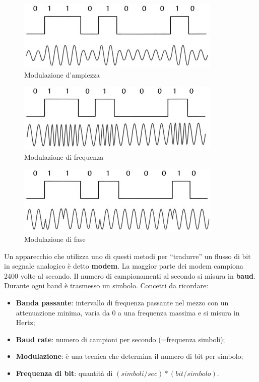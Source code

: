 \begin{figure}[htbp]
\centering
\includegraphics[scale=1]{images/modulazione_ask.jpg}
\caption{Modulazione d'ampiezza}
\end{figure}

\begin{figure}[htbp]
\centering
\includegraphics[scale=1]{images/modulazione_fsk.jpg}
\caption{Modulazione di frequenza}
\end{figure}

\begin{figure}[htbp]
\centering
\includegraphics[scale=1]{images/modulazione_psk.jpg}
\caption{Modulazione di fase}
\end{figure}

Un apparecchio che utilizza uno di questi metodi per ``tradurre'' un flusso di bit in segnale analogico è detto \textbf{modem}. La maggior parte dei modem campiona 2400 volte al secondo. Il numero di campionamenti al secondo si misura in \textbf{baud}. Durante ogni baud è trasmesso un simbolo.
Concetti da ricordare:

\begin{itemize}
\item{\textbf{Banda passante}: intervallo di frequenza passante nel mezzo con un attenuazione minima, varia da 0 a una frequenza massima e si misura in Hertz};
\item{\textbf{Baud rate}: numero di campioni per secondo (=frequenza simboli)};
\item{\textbf{Modulazione}: è una tecnica che determina il numero di bit per simbolo};
\item{\textbf{Frequenza di bit}: quantità di $(simboli/sec)*(bit/simbolo)$}.

\end{itemize}

